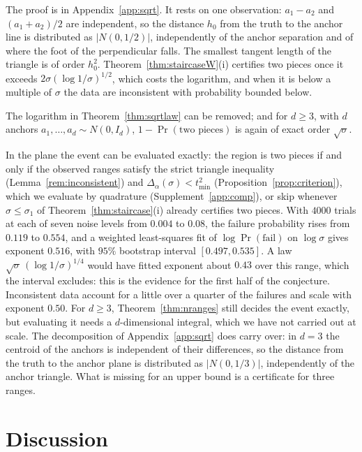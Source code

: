 The proof is in Appendix~\ref{app:sqrt}. It rests on one observation: $a_1 - a_2$ and $(a_1 + a_2)/2$ are independent, so the
distance $h_0$ from the truth to the anchor line is distributed as $|N(0, 1/2)|$, independently of
the anchor separation and of where the foot of the perpendicular falls. The smallest tangent length of the triangle is of
order $h_0^2$. Theorem~\ref{thm:staircaseW}(i) certifies two pieces once it exceeds $2\sigma(\log 1/\sigma)^{1/2}$, which
costs the logarithm, and when it is below a multiple of $\sigma$ the data are inconsistent with probability bounded
below.

\begin{conjecture}\label{conj:sqrt}
The logarithm in Theorem~\ref{thm:sqrtlaw} can be removed; and for $d \ge 3$, with $d$ anchors
$a_1, \dots, a_d \sim N(0, I_d)$, $1 - \Pr(\text{two pieces})$ is again of exact order $\sqrt\sigma$.
\end{conjecture}

In the plane the event can be evaluated exactly: the region is two pieces if and only if the observed ranges satisfy the
strict triangle inequality (Lemma~\ref{rem:inconsistent}) and $\Delta_\alpha(\sigma) < t_{\min}^2$
(Proposition~\ref{prop:criterion}), which we evaluate by quadrature (Supplement~\ref{app:comp}), or skip whenever
$\sigma \le \sigma_1$ of Theorem~\ref{thm:staircase}(i) already certifies two pieces. With $4000$ trials at each of seven
noise levels from $0.004$ to $0.08$, the failure probability rises from $0.119$ to $0.554$, and a weighted least-squares
fit of $\log\Pr(\text{fail})$ on $\log\sigma$ gives exponent $0.516$, with $95\%$ bootstrap interval $[0.497, 0.535]$. A law
$\sqrt\sigma\,(\log 1/\sigma)^{1/4}$ would have fitted exponent about $0.43$ over this range, which the interval excludes:
this is the evidence for the first half of the conjecture. Inconsistent data account for a little over a
quarter of the failures and scale with exponent $0.50$. For $d \ge 3$, Theorem~\ref{thm:nranges} still decides the event
exactly, but evaluating it needs a $d$-dimensional integral, which we have not carried out at scale. The decomposition of
Appendix~\ref{app:sqrt} does carry over: in $d = 3$ the centroid of the anchors is independent of their differences, so
the distance from the truth to the anchor plane is distributed as $|N(0, 1/3)|$, independently of the anchor triangle.
What is missing for an upper bound is a certificate for three ranges.

\section{Discussion}\label{sec:discussion}

